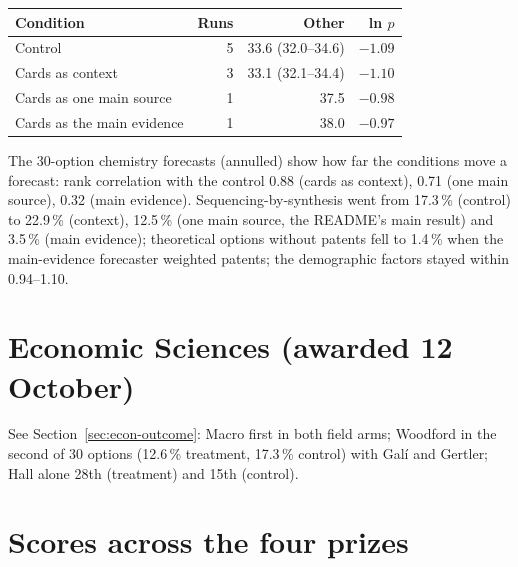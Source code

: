 \documentclass[11pt,a4paper]{article}
\begin{document}
\begin{center}
\small
\begin{tabular}{@{}lrrr@{}}
\toprule
Condition & Runs & Other & ln $p$ \\
\midrule
Control & 5 & 33.6 (32.0--34.6) & $-1.09$ \\
Cards as context & 3 & 33.1 (32.1--34.4) & $-1.10$ \\
Cards as one main source & 1 & 37.5 & $-0.98$ \\
Cards as the main evidence & 1 & 38.0 & $-0.97$ \\
\bottomrule
\end{tabular}
\end{center}

\noindent The 30-option chemistry forecasts (annulled) show how far the conditions move a forecast: rank correlation
with the control 0.88 (cards as context), 0.71 (one main source), 0.32 (main evidence). Sequencing-by-synthesis went
from 17.3\,\% (control) to 22.9\,\% (context), 12.5\,\% (one main source, the README's main result) and 3.5\,\% (main
evidence); theoretical options without patents fell to 1.4\,\% when the main-evidence forecaster weighted patents; the
demographic factors stayed within 0.94--1.10.

\section{Economic Sciences (awarded 12 October)}

See Section~\ref{sec:econ-outcome}: Macro first in both field arms; Woodford in the second of 30 options (12.6\,\%
treatment, 17.3\,\% control) with Galí and Gertler; Hall alone 28th (treatment) and 15th (control).

\section{Scores across the four prizes}\label{sec:scores}
\end{document}
